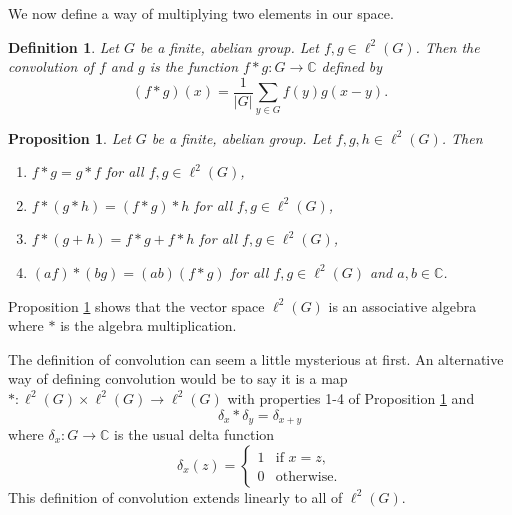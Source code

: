 \documentclass[12pt]{article}
\newtheorem{Definition}{Definition}
\newtheorem{Proposition}{Proposition}
\newcommand{\C}{\mathbb{C}}
\begin{document}
We now define a way of multiplying two elements in our space.

\begin{Definition} \label{convolution}%
    Let $G$ be a finite, abelian group.
    Let $f,g\in \ell^2(G)$.
    Then the convolution of $f$ and $g$ is the function $f*g:G\to \C$ defined by
    \[
        (f*g)(x)=\frac{1}{|G|}\sum_{y\in G}f(y)g(x-y).
    \]
\end{Definition}



\begin{Proposition} \label{convolution properties} %
    Let $G$ be a finite, abelian group. Let $f, g, h\in \ell^2(G)$. Then
    \begin{enumerate}
        \item $f*g = g*f$ for all $f, g \in \ell^2(G)$,
        \item $f*(g*h) = (f*g)*h$ for all $f, g \in \ell^2(G)$,
        \item $f*(g+h) = f*g + f*h$ for all $f, g \in \ell^2(G)$,
        \item $(af) * (bg) = (ab)(f*g)$ for all $f, g \in \ell^2(G)$ and $a, b\in \C$.
    \end{enumerate}
\end{Proposition}

Proposition \ref{convolution properties} shows that the vector space $\ell^2(G)$ is an associative algebra where $*$ is the algebra multiplication.

The definition of convolution can seem a little mysterious at first.
An alternative way of defining convolution would be to say it is a map $*:\ell^2(G) \times \ell^2(G) \to \ell^2(G)$ with properties 1-4 of Proposition \ref{convolution properties} and
\[
    \delta_x * \delta_y = \delta_{x+y}
\]
where $\delta_x:G\to \C$ is the usual delta function
\[
    \delta_x(z) =
    \begin{cases}
        1 & \text{if } x = z, \\
        0 & \text{otherwise}.
    \end{cases}
\]
This definition of convolution extends linearly to all of $\ell^2(G)$.
\end{document}
